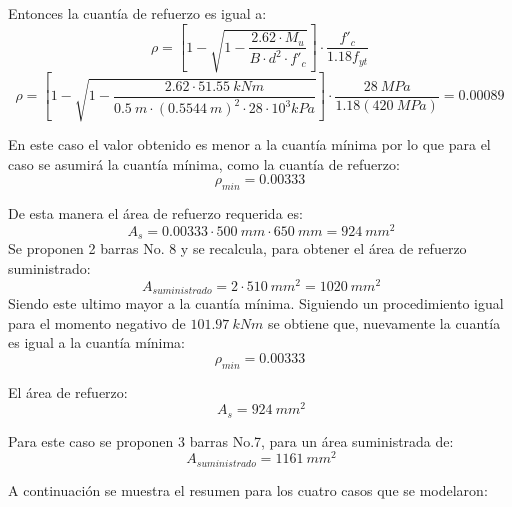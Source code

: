 \documentclass[12pt]{article}
\begin{document}
Entonces la cuantía de refuerzo es igual a:
\begin{equation*}
    \rho=\left[1-\sqrt{1-\frac{2.62\cdot M_{u}}{B\cdot d^2\cdot f'_{c}}}\right]\cdot \frac{f'_{c}}{1.18 f_{yt}}
\end{equation*}
\begin{equation*}
    \rho=\left[1-\sqrt{1-\frac{2.62\cdot 51.55~kNm}{0.5~m\cdot (0.5544~m)^2\cdot 28\cdot 10^3 kPa}}\right]\cdot \frac{28~MPa}{1.18 (420~MPa)}=0.00089
\end{equation*}

En este caso el valor obtenido es menor a la cuantía mínima por lo que para el caso se asumirá la cuantía mínima, como la cuantía de refuerzo:
\begin{equation*}
    \rho_{min}=0.00333
\end{equation*}

De esta manera el área de refuerzo requerida es:
\begin{equation*}
    \ A_{s}=0.00333\cdot 500~mm\cdot 650~mm=924~mm^2
\end{equation*}
Se proponen 2 barras No. 8 y se recalcula, para obtener el área de refuerzo suministrado:
\begin{equation*}
    \ A_{suministrado}=2\cdot 510~mm^2=1020~mm^2
\end{equation*}
Siendo este ultimo mayor a la cuantía mínima.
Siguiendo un procedimiento igual para el momento negativo de $101.97~kNm$ se obtiene que, nuevamente la cuantía es igual a la cuantía mínima:
\begin{equation*}
    \rho_{min}=0.00333
\end{equation*}

El área de refuerzo:
\begin{equation*}
    \ A_{s}=924~mm^2
\end{equation*}

Para este caso se proponen 3 barras No.7, para un área suministrada de:
\begin{equation*}
    \ A_{suministrado}=1161~mm^2
\end{equation*}

A continuación se muestra el resumen para los cuatro casos que se modelaron:


\end{document}
